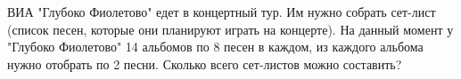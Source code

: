\question
ВИА "Глубоко Фиолетово" едет в концертный тур. Им нужно собрать сет-лист (список песен, которые они планируют играть на концерте). На данный момент у "Глубоко Фиолетово" 14 альбомов по 8 песен в каждом, из каждого альбома нужно отобрать по 2 песни. Сколько всего сет-листов можно составить?
